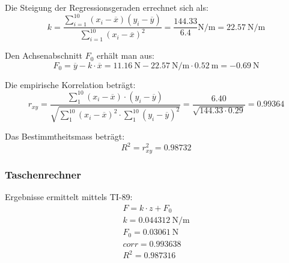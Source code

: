 Die Steigung der Regressionsgeraden errechnet sich als:
\begin{equation}
    k = \frac{\sum_{i=1}^{10}(x_i-\overline{x})(y_i-\overline{y})}{\sum_{i=1}^{10}(x_i-\overline{x})^2} = \frac{144.33}{6.4} \si{\newton\per\meter} = \SI{22.57}{\newton\per\meter}
\end{equation}

Den Achsenabschnitt $F_0$ erh\"alt man aus:
\begin{equation}
    F_0 = \overline{y} - k \cdot \overline{x} = \SI{11.16}{\newton} - \SI{22.57}{\newton\per\meter} \cdot \SI{0.52}{\meter} = \SI{-0.69}{\newton}
\end{equation}

Die empirische Korrelation betr\"agt:
\begin{equation}
    r_{xy} = \frac{\sum_{1}^{10}(x_i - \overline{x}) \cdot (y_i - \overline{y})}{\sqrt{\sum_{1}^{10}(x_i-\overline{x})^2 \cdot \sum_{1}^{10}(y_i-\overline{y})^2}}
           = \frac{6.40}{\sqrt{144.33 \cdot 0.29}} = 0.99364
\end{equation}

Das Bestimmtheitsmass betr\"agt:
\begin{equation}
    R^{2} = r_{xy}^2 = 0.98732
\end{equation}

\subsubsection{Taschenrechner}
Ergebnisse ermittelt mittels TI-89:
\begin{gather*}
    F = k \cdot z + F_0 \\
    k = \SI{0.044312}{\newton\per\meter} \\
    F_0 = \SI{0.03061}{\newton} \\
    corr = 0.993638 \\
    R^2 = 0.987316
\end{gather*}
